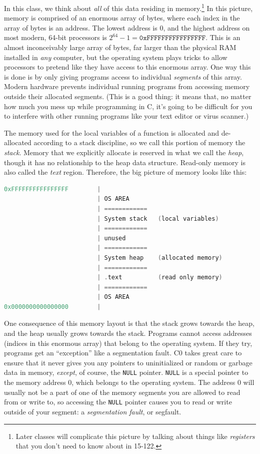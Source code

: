 In this class, we think about \emph{all} of this data residing in
memory.\footnote{Later classes will complicate this picture by talking about
  things like \emph{registers} that you don't need to know about in 15-122.} In
this picture, memory is comprised of an enormous array of bytes, where each
index in the array of bytes is an address. The lowest address is 0, and the
highest address on most modern, 64-bit processors is $2^{64} - 1 =
\texttt{0xFFFFFFFFFFFFFFFF}$.  This is an almost inconceivably large array of
bytes, far larger than the physical RAM installed in \emph{any} computer, but
the operating system plays tricks to allow processors to pretend like they
have access to this enormous array. One way this is done is by only giving
programs access to individual \emph{segments} of this array. Modern hardware
prevents individual running programs from accessing memory outside their
allocated segments. (This is a good thing: it means that, no matter how much
you mess up while programming in C, it's going to be difficult for you to
interfere with other running programs like your text editor or virus scanner.)

The memory used for the local variables of a function is allocated and
de-allocated according to a stack discipline, so we call this portion of
memory the \emph{stack}. Memory that we explicitly allocate is reserved in
what we call the \emph{heap}, though it has no relationship to the heap data
structure. Read-only memory is also called the \emph{text} region. Therefore,
the big picture of memory looks like this:
\begin{lstlisting}[language=c]
0xFFFFFFFFFFFFFFFF        |
                          | OS AREA
                          | ============
                          | System stack   (local variables)
                          | ============
                          | unused
                          | ============
                          | System heap    (allocated memory)
                          | ============
                          | .text          (read only memory)
                          | ============
                          | OS AREA
0x0000000000000000        |
\end{lstlisting}

One consequence of this memory layout is that the stack grows towards
the heap, and the heap usually grows towards the stack.  Programs
cannot access addresses (indices in this enormous array) that belong
to the operating system.  If they try, programs get an ``exception''
like a segmentation fault.  C0 takes great care to ensure that it
never gives you any pointers to uninitialized or random or garbage
data in memory, \emph{except}, of course, the \lstinline'NULL' pointer.
\lstinline'NULL' is a special pointer to the memory address 0, which
belongs to the operating system. The address 0 will usually not be a
part of one of the memory segments you are allowed to read from or
write to, so accessing the \lstinline'NULL' pointer causes you to read or
write outside of your segment: a \emph{segmentation fault}, or
segfault.



